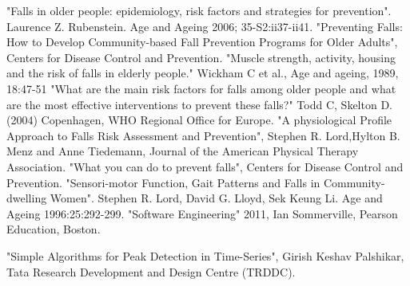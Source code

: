 \begin{thebibliography}{99}
"Falls in older people: epidemiology, risk factors and strategies for prevention". Laurence Z. Rubenstein. Age and Ageing 2006; 35-S2:ii37-ii41.
"Preventing Falls: How to Develop Community-based Fall Prevention Programs for Older Adults", Centers for Disease Control and Prevention.
"Muscle strength, activity, housing and the risk of falls in elderly people." Wickham C et al., Age and ageing, 1989, 18:47-51
"What are the main risk factors for falls among older people and what are the most effective interventions to prevent these falls?" Todd C, Skelton D. (2004) Copenhagen, WHO Regional Office for Europe. 
"A physiological Profile Approach to Falls Risk Assessment and Prevention", Stephen R. Lord,Hylton B. Menz and Anne Tiedemann, Journal of the American Physical Therapy Association. 
"What you can do to prevent falls", Centers for Disease Control and Prevention.
"Sensori-motor Function, Gait Patterns and Falls in Community-dwelling Women". Stephen R. Lord, David G. Lloyd, Sek Keung Li. Age and Ageing 1996:25:292-299.
"Software Engineering" 2011, Ian Sommerville, Pearson Education, Boston.

"Simple Algorithms for Peak Detection in Time-Series", Girish Keshav Palshikar, Tata Research Development and Design Centre (TRDDC).

\end{thebibliography}
